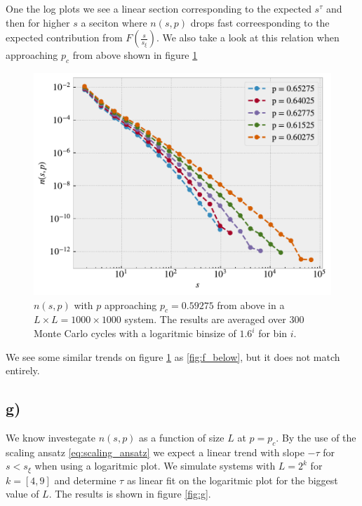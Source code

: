 \documentclass[reprint, amsmath, amssymb, aps]{revtex4-2}
\begin{document}
One the log plots we see a linear section corresponding to the expected $ s^\tau$ and then for higher $s$ a seciton where $n(s,p)$ drops fast correesponding to the expected contribution from $F\left(\frac{s}{s_\xi}\right)$. We also take a look at this relation when approaching $p_c$ from above shown in figure \ref{fig:f_above}

\begin{figure}[H]
  \includegraphics[width=\linewidth]{figures/f_p_above.pdf}
  \caption{$n(s,p)$ with $p$ approaching $p_c = 0.59275$ from above in a $L \times L = 1000 \times 1000$ system. The results are averaged over 300 Monte Carlo cycles with a logaritmic binsize of $1.6^i$ for bin $i$.}
  \label{fig:f_above}
\end{figure}

We see some similar trends on figure \ref{fig:f_above} as \ref{fig:f_below}, but it does not match entirely.
%
%
\subsection*{g)}
We know investegate $n(s,p)$ as a function of size $L$ at $p=p_c$. By the use of the scaling ansatz \ref{eq:scaling_ansatz} we expect a linear trend with slope $-\tau$ for $s<s_\xi$ when using a logaritmic plot. We simulate systems with $L = 2^k$ for $k = [4,9]$ and determine $\tau$ as linear fit on the logaritmic plot for the biggest value of $L$. The results is shown in figure \ref{fig:g}.
\end{document}
